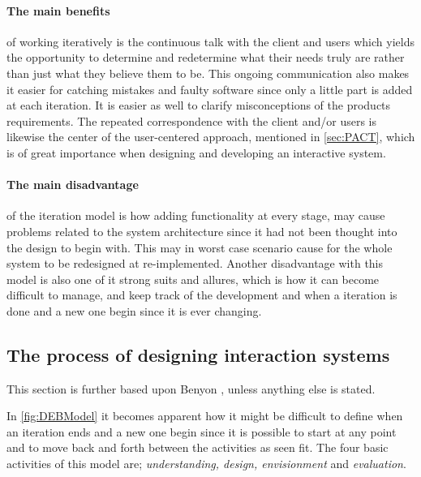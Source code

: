 \paragraph{The main benefits}
of working iteratively is the continuous talk with the client and users which yields the opportunity to determine and redetermine what their needs truly are rather than just what they believe them to be.
This ongoing communication also makes it easier for catching mistakes and faulty software since only a little part is added at each iteration.
It is easier as well to clarify misconceptions of the products requirements.
The repeated correspondence with the client and/or users is likewise the center of the user-centered approach, mentioned in \cref{sec:PACT}, which is of great importance when designing and developing an interactive system.

\paragraph{The main disadvantage} of the iteration model is how adding functionality at every stage, may cause problems related to the system architecture since it had not been thought into the design to begin with.
This may in worst case scenario cause for the whole system to be redesigned at re-implemented.
Another disadvantage with this model is also one of it strong suits and allures, which is how it can become difficult to manage, and keep track of the development and when a iteration is done and a new one begin since it is ever changing.


\subsection{The process of designing interaction systems}\label{sec:Iterative1}
This section is further based upon Benyon \cite{Benyon}, unless anything else is stated.

In \cref{fig:DEBModel} it becomes apparent how it might be difficult to define when an iteration ends and a new one begin since it is possible to start at any point and to move back and forth between the activities as seen fit.
The four basic activities of this model are; \textit{understanding, design, envisionment} and \textit{evaluation}.

